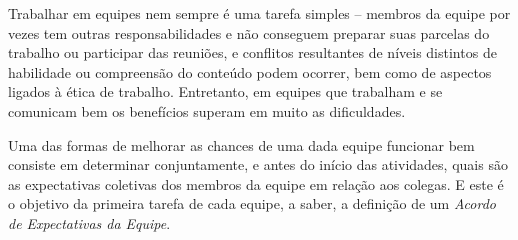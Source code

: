 \documentclass{letter}
\begin{document}
\begin{letter}{}
Trabalhar em equipes nem sempre é uma tarefa simples -- membros da equipe por vezes tem outras responsabilidades e não conseguem preparar suas parcelas do trabalho ou participar das reuniões, e conflitos resultantes de níveis distintos de habilidade ou compreensão do conteúdo podem ocorrer, bem como de aspectos ligados à ética de trabalho. Entretanto, em equipes que trabalham e se comunicam bem os benefícios superam em muito as dificuldades. 

Uma das formas de melhorar as chances de uma dada equipe funcionar bem consiste em determinar conjuntamente, e antes do início das atividades, quais são as expectativas coletivas dos membros da equipe em relação aos colegas. E este é o objetivo da primeira tarefa de cada equipe, a saber, a definição de um \textit{Acordo de Expectativas da Equipe}.

\end{letter}
\end{document}
